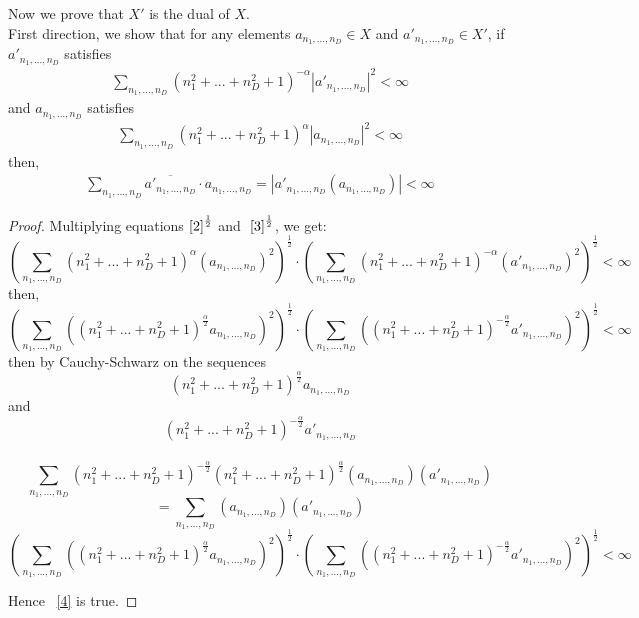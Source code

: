 \documentclass{article}
\theoremstyle{definition}
\begin{document}
Now we prove that $X'$ is the dual of $X$. \\
First direction, we show that for any elements $a_{n_1,..., n_D} \in X$ and $a'_{n_1,..., n_D} \in X'$, if $a'_{n_1,..., n_D}$ satisfies
\begin{align}
    \sum_{n_1,..., n_D} (n_1^2 +...+ n_D^2 + 1)^{-\alpha} \left|{a'_{n_1,..., n_D}}\right|^2 < \infty \label{2}
\end{align} and $a_{n_1,..., n_D}$ satisfies 
\begin{align}
   \sum_{n_1,..., n_D} (n_1^2 +...+ n_D^2 + 1)^{\alpha} \left|{a_{n_1,..., n_D}}\right|^2 < \infty \label{3}
\end{align}
then,
\begin{align}
   \sum_{n_1,..., n_D} \overline{a'_{n_1,..., n_D}} \cdot a_{n_1,..., n_D} =  \left|a'_{n_1,..., n_D} (a_{n_1,..., n_D})\right| < \infty \label{4}
\end{align}
\begin{proof}
    Multiplying equations$~\eqref{2}^{\frac{1}{2}}$ and $~\eqref{3}^{\frac{1}{2}}$, we get:
\[ \left(\sum_{n_1,..., n_D} (n_1^2 +...+ n_D^2 + 1)^{\alpha} ({a_{n_1,..., n_D}})^2\right)^{\frac{1}{2}} \cdot  \left(\sum_{n_1,..., n_D} (n_1^2 +...+ n_D^2 + 1)^{-\alpha} ({a'_{n_1,..., n_D}})^2\right)^{\frac{1}{2}}  < \infty \]
then, 
\[ \left(\sum_{n_1,..., n_D} \left((n_1^2 +...+ n_D^2 + 1)^{\frac{\alpha}{2}} {a_{n_1,..., n_D}}\right)^2\right)^{\frac{1}{2}} \cdot  \left(\sum_{n_1,..., n_D} \left((n_1^2 +...+ n_D^2 + 1)^{-\frac{\alpha}{2}}{a'_{n_1,..., n_D}}\right)^2\right)^{\frac{1}{2}}  < \infty \]
then by Cauchy-Schwarz on the sequences $$(n_1^2 +...+ n_D^2 + 1)^{\frac{\alpha}{2}} {a_{n_1,..., n_D}}$$ and $$(n_1^2 +...+ n_D^2 + 1)^{-\frac{\alpha}{2}}{a'_{n_1,..., n_D}}$$\\
\[ \sum_{n_1,..., n_D} (n_1^2 +...+ n_D^2 + 1)^{-\frac{\alpha}{2}} (n_1^2 +...+ n_D^2 + 1)^{\frac{\alpha}{2}} ({a_{n_1,..., n_D}}) ({a'_{n_1,..., n_D}}) 
\]
\[ = \sum_{n_1,..., n_D} ({a_{n_1,..., n_D}}) ({a'_{n_1,..., n_D}}) 
\]
\[ \left(\sum_{n_1,..., n_D} \left((n_1^2 +...+ n_D^2 + 1)^{\frac{\alpha}{2}} {a_{n_1,..., n_D}}\right)^2\right)^{\frac{1}{2}} \cdot  \left(\sum_{n_1,..., n_D} \left((n_1^2 +...+ n_D^2 + 1)^{-\frac{\alpha}{2}}{a'_{n_1,..., n_D}}\right)^2\right)^{\frac{1}{2}}  < \infty \]

Hence ~\eqref{4} is true.
\end{proof}
\end{document}
